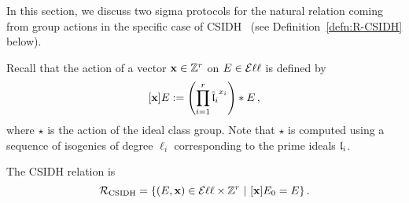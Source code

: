 
In this section, we discuss two sigma protocols for the natural relation coming from group actions in the specific case of CSIDH~\cite{CSIDH} (see Definition~\ref{defn:R-CSIDH} below).


Recall that the action of a vector $\bx \in \mathbb{Z}^r$ on $E \in \Ell$ is defined by \[ [\bx]E := \left( \prod_{i=1}^r {\overline{\fl}_i}^{x_i} \right) \star E  \, , \] where $\star$ is the action of the ideal class group. Note that $\star$ is computed using a sequence of isogenies of degree $\ell_i$ corresponding to the prime ideals $\fl_i$.



\begin{definition} \label{defn:R-CSIDH}
The CSIDH relation is
\[
\R[CSIDH] = \left\{ (E,\bx) \in \Ell \times \mathbb{Z}^r \,\, | \,\, [\bx]E_0 = E \right\}.
\]
\end{definition}





